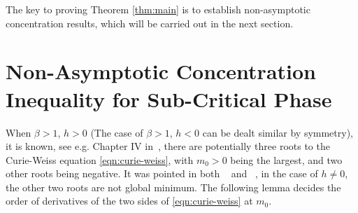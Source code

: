 \documentclass{amsart}
\newtheorem{rem}[thm]{Remark}
\begin{document}
         
         
         
         
         The key to proving Theorem \ref{thm:main} is to establish non-asymptotic concentration results, which will be carried out in the next section. 
         
         
         
         
         
\section{Non-Asymptotic Concentration Inequality for Sub-Critical Phase}
\label{sec:concentration}

When $\beta>1$, $h>0$ (The case of $\beta>1$, $h<0$ can be dealt similar by symmetry), it is known, see e.g. Chapter IV in~\cite{ellis2006entropy}, there are potentially three roots to the Curie-Weiss equation \eqref{eqn:curie-weiss}, with $m_0>0$ being the largest, and two other roots being negative. It was pointed in both ~\cite[Chapter VI]{ellis2006entropy} and ~\cite{bierkens2017}, in the case of $h\neq 0$, the other two roots are not global minimum. 
The following lemma decides the order of derivatives of the two sides of \eqref{eqn:curie-weiss} at $m_0$. 
\end{document}

